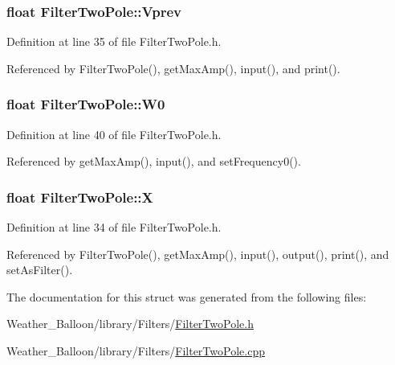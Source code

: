 \subsubsection[{\texorpdfstring{Vprev}{Vprev}}]{\setlength{\rightskip}{0pt plus 5cm}float Filter\+Two\+Pole\+::\+Vprev}\hypertarget{struct_filter_two_pole_a2d233c81ce30dad4381b07e5b3f44e12}{}\label{struct_filter_two_pole_a2d233c81ce30dad4381b07e5b3f44e12}


Definition at line 35 of file Filter\+Two\+Pole.\+h.



Referenced by Filter\+Two\+Pole(), get\+Max\+Amp(), input(), and print().

\subsubsection[{\texorpdfstring{W0}{W0}}]{\setlength{\rightskip}{0pt plus 5cm}float Filter\+Two\+Pole\+::\+W0}\hypertarget{struct_filter_two_pole_a75db29bd8a0c047b02c0441dea3e8212}{}\label{struct_filter_two_pole_a75db29bd8a0c047b02c0441dea3e8212}


Definition at line 40 of file Filter\+Two\+Pole.\+h.



Referenced by get\+Max\+Amp(), input(), and set\+Frequency0().

\subsubsection[{\texorpdfstring{X}{X}}]{\setlength{\rightskip}{0pt plus 5cm}float Filter\+Two\+Pole\+::X}\hypertarget{struct_filter_two_pole_ac5e4eba07238dc7050e0a6eb99dc42ce}{}\label{struct_filter_two_pole_ac5e4eba07238dc7050e0a6eb99dc42ce}


Definition at line 34 of file Filter\+Two\+Pole.\+h.



Referenced by Filter\+Two\+Pole(), get\+Max\+Amp(), input(), output(), print(), and set\+As\+Filter().



The documentation for this struct was generated from the following files\+:\begin{DoxyCompactItemize}
\item 
Weather\+\_\+\+Balloon/library/\+Filters/\hyperlink{_filter_two_pole_8h}{Filter\+Two\+Pole.\+h}\item 
Weather\+\_\+\+Balloon/library/\+Filters/\hyperlink{_filter_two_pole_8cpp}{Filter\+Two\+Pole.\+cpp}\end{DoxyCompactItemize}
